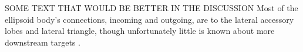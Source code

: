 SOME TEXT THAT WOULD BE BETTER IN THE DISCUSSION
Most of the ellipsoid body's connections, incoming and outgoing, are to the lateral accessory lobes and lateral triangle, though unfortunately little is known about more downstream targets \cite{Pfeiffer2014,Young2010}.

\begin{comment} %
SOME TEXT THAT WOULD BE BETTER IN THE RESULTS
Short-term memory for visually defined headings has been shown to be dependent on the expression of a molecule involved in memory formation (S6 kinase II) in R3 and R4 ring neurons.
Mutant flies ($ign^{\emph{58/1}}$) without this expression reoriented towards the new bar in the bar fixation paradigm, but when it disappeared they did not turn to face their original direction.
When expression was restored in these flies, they would again reorient towards the (invisible) original bar location.
\end{comment}